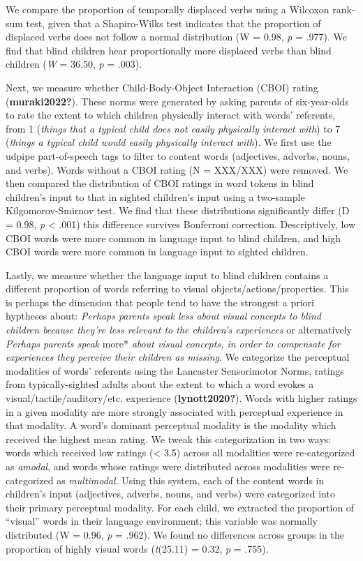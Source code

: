 \documentclass[
  man,floatsintext]{apa6}
\begin{document}
We compare the proportion of temporally displaced verbs using a Wilcoxon rank-sum test, given that a Shapiro-Wilks test indicates that the proportion of displaced verbs does not follow a normal distribution (W = 0.98, \emph{p} = .977). We find that blind children hear proportionally more displaced verbs than blind children (\emph{W} = 36.50, \emph{p} = .003).

Next, we measure whether Child-Body-Object Interaction (CBOI) rating (\textbf{muraki2022?}). These norms were generated by asking parents of six-year-olds to rate the extent to which children physically interact with words' referents, from 1 (\emph{things that a typical child does not easily physically interact with}) to 7 (\emph{things a typical child would easily physically interact with}). We first use the udpipe part-of-speech tags to filter to content words (adjectives, adverbs, nouns, and verbs). Words without a CBOI rating (N = XXX/XXX) were removed. We then compared the distribution of CBOI ratings in word tokens in blind children's input to that in sighted children's input using a two-sample Kilgomorov-Smirnov test. We find that these distributions significantly differ (D = 0.98, \emph{p} \textless{} .001) this difference survives Bonferroni correction. Descriptively, low CBOI words were more common in language input to blind children, and high CBOI words were more common in language input to sighted children.

Lastly, we measure whether the language input to blind children contains a different proportion of words referring to visual objects/actions/properties. This is perhaps the dimension that people tend to have the strongest a priori hyptheses about: \emph{Perhaps parents speak less about visual concepts to blind children because they're less relevant to the children's experiences} or alternatively \emph{Perhaps parents speak} more* \emph{about visual concepts, in order to compensate for experiences they perceive their children as missing}. We categorize the perceptual modalities of words' referents using the Lancaster Sensorimotor Norms, ratings from typically-sighted adults about the extent to which a word evokes a visual/tactile/auditory/etc. experience (\textbf{lynott2020?}). Words with higher ratings in a given modality are more strongly associated with perceptual experience in that modality. A word's dominant perceptual modality is the modality which received the highest mean rating. We tweak this categorization in two ways: words which received low ratings (\textless{} 3.5) across all modalities were re-categorized as \emph{amodal}, and words whose ratings were distributed across modalities were re-categorized as \emph{multimodal}. Using this system, each of the content words in children's input (adjectives, adverbs, nouns, and verbs) were categorized into their primary perceptual modality. For each child, we extracted the proportion of ``visual'' words in their language environment; this variable was normally distributed (W = 0.96, \emph{p} = .962). We found no differences across groups in the proportion of highly visual words (\emph{t}(25.11) = 0.32, \emph{p} = .755).
\end{document}
